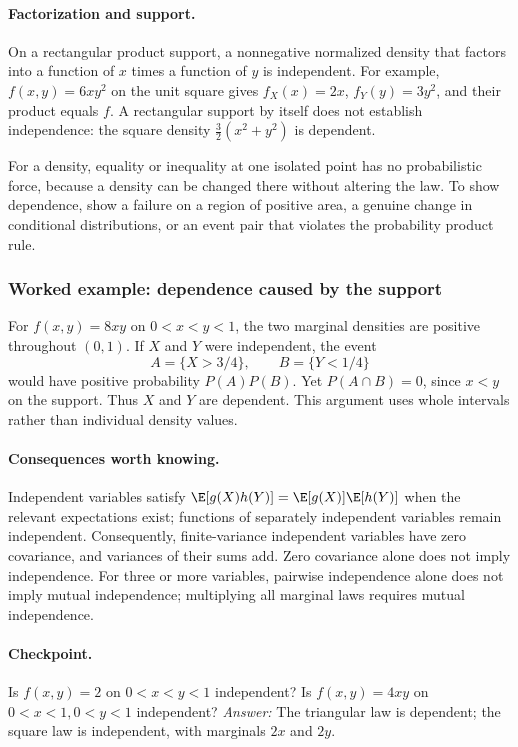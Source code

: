 \paragraph{Factorization and support.} On a rectangular product support, a nonnegative normalized density that factors into a function of $x$ times a function of $y$ is independent. For example, $f(x,y)=6xy^2$ on the unit square gives $f_X(x)=2x$, $f_Y(y)=3y^2$, and their product equals $f$. A rectangular support by itself does not establish independence: the square density $\tfrac32(x^2+y^2)$ is dependent.

For a density, equality or inequality at one isolated point has no probabilistic force, because a density can be changed there without altering the law. To show dependence, show a failure on a region of positive area, a genuine change in conditional distributions, or an event pair that violates the probability product rule.

\subsubsection*{Worked example: dependence caused by the support}
For $f(x,y)=8xy$ on $0<x<y<1$, the two marginal densities are positive throughout $(0,1)$. If $X$ and $Y$ were independent, the event
\[
 A=\{X>3/4\},\qquad B=\{Y<1/4\}
\]
would have positive probability $P(A)P(B)$. Yet $P(A\cap B)=0$, since $x<y$ on the support. Thus $X$ and $Y$ are dependent. This argument uses whole intervals rather than individual density values.

\paragraph{Consequences worth knowing.} Independent variables satisfy $\E[g(X)h(Y)]=\E[g(X)]\E[h(Y)]$ when the relevant expectations exist; functions of separately independent variables remain independent. Consequently, finite-variance independent variables have zero covariance, and variances of their sums add. Zero covariance alone does not imply independence. For three or more variables, pairwise independence alone does not imply mutual independence; multiplying all marginal laws requires mutual independence.

\paragraph{Checkpoint.} Is $f(x,y)=2$ on $0<x<y<1$ independent? Is $f(x,y)=4xy$ on $0<x<1,0<y<1$ independent? \emph{Answer:} The triangular law is dependent; the square law is independent, with marginals $2x$ and $2y$.

